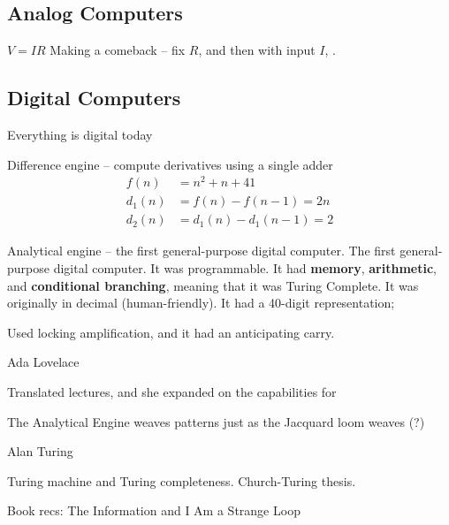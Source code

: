 \subsection{Analog Computers}
$V = IR$
Making a comeback -- fix $R$, and then with input $I$, .

\subsection{Digital Computers}
Everything is digital today

Difference engine -- compute derivatives using a single adder
\begin{align*}
    f(n) &= n^2 + n + 41\\
    d_1(n) &= f(n) - f(n-1) = 2n \\
    d_2(n) &= d_1(n) - d_1(n-1) = 2
\end{align*}

Analytical engine -- the first general-purpose digital computer.
The first general-purpose digital computer.
It was programmable.
It had \textbf{memory}, \textbf{arithmetic}, and \textbf{conditional branching}, meaning that it was Turing Complete.
It was originally in decimal (human-friendly).
It had a 40-digit representation;

Used locking amplification, and it had an anticipating carry.



Ada Lovelace

Translated lectures, and she expanded on the capabilities for

The Analytical Engine weaves patterns just as the Jacquard loom weaves (?)


Alan Turing

Turing machine and Turing completeness.
Church-Turing thesis.

Book recs: The Information and I Am a Strange Loop

